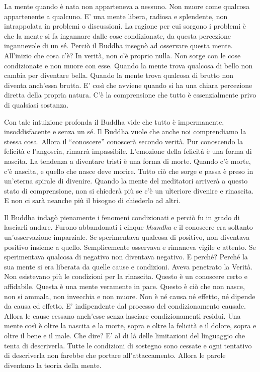 La mente quando è nata non apparteneva a nessuno. Non muore come
qualcosa appartenente a qualcuno. E' una mente libera, radiosa e
splendente, non intrappolata in problemi o discussioni. La ragione per
cui sorgono i problemi è che la mente si fa ingannare dalle cose
condizionate, da questa percezione ingannevole di un sé. Perciò il
Buddha insegnò ad osservare questa mente. All'inizio che cosa c'è? In
verità, non c'è proprio nulla. Non sorge con le cose condizionate e non
muore con esse. Quando la mente trova qualcosa di bello non cambia per
diventare bella. Quando la mente trova qualcosa di brutto non diventa
anch'essa brutta. E' così che avviene quando si ha una chiara percezione
diretta della propria natura. C'è la comprensione che tutto è
essenzialmente privo di qualsiasi sostanza.

Con tale intuizione profonda il Buddha vide che tutto è impermanente,
insoddisfacente e senza un sé. Il Buddha vuole che anche noi
comprendiamo la stessa cosa. Allora il ``conoscere'' conoscerà secondo
verità. Pur conoscendo la felicità e l'angoscia, rimarrà impassibile.
L'emozione della felicità è una forma di nascita. La tendenza a
diventare tristi è una forma di morte. Quando c'è morte, c'è nascita, e
quello che nasce deve morire. Tutto ciò che sorge e passa è preso in
un'eterna spirale di divenire. Quando la mente del meditatori arriverà a
questo stato di comprensione, non si chiederà più se c'è un ulteriore
divenire e rinascita. E non ci sarà neanche più il bisogno di chiederlo
ad altri.

Il Buddha indagò pienamente i fenomeni condizionati e perciò fu in grado
di lasciarli andare. Furono abbandonati i cinque \emph{khandha} e il conoscere
era soltanto un'osservazione imparziale. Se sperimentava qualcosa di
positivo, non diventava positivo insieme a quello. Semplicemente
osservava e rimaneva vigile e attento. Se sperimentava qualcosa di
negativo non diventava negativo. E perché? Perché la sua mente si era
liberata da quelle cause e condizioni. Aveva penetrato la Verità. Non
esistevano più le condizioni per la rinascita. Questo è un conoscere
certo e affidabile. Questa è una mente veramente in pace. Questo è ciò
che non nasce, non si ammala, non invecchia e non muore. Non è né causa
né effetto, né dipende da causa ed effetto. E' indipendente dal processo
del condizionamento causale. Allora le cause cessano anch'esse senza
lasciare condizionamenti residui. Una mente così è oltre la nascita e la
morte, sopra e oltre la felicità e il dolore, sopra e oltre il bene e il
male. Che dire? E' al di là delle limitazioni del linguaggio che tenta
di descriverla. Tutte le condizioni di sostegno sono cessate e ogni
tentativo di descriverla non farebbe che portare all'attaccamento.
Allora le parole diventano la teoria della mente.

